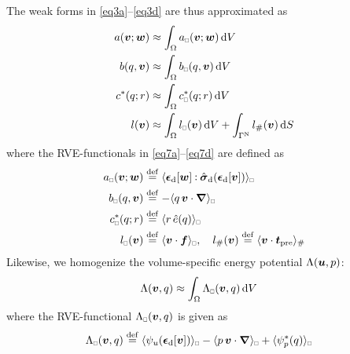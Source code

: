 \documentclass{bmcart}
\newcommand{\eqtrefrange}[2]{\eqref{#1}--\eqref{#2}}
\DeclarePairedDelimiter{\homgen}{\langle}{\rangle_\rve}
\newcommand{\prescribed}{\mathrm{pre}}
\renewcommand{\dev}{\mathrm{d}}
\newcommand{\rve}{
  {\mathchoice
   {\mbox{\scalebox{0.67}{$\Box$}}}
   {\mbox{\scalebox{0.67}{$\Box$}}}
   {\mbox{\scalebox{0.5}{$\Box$}}}
   {\mbox{\scalebox{0.375}{$\Box$}}}
  }
}
\begin{document}
The weak forms in \eqtrefrange{eq3a}{eq3d} are thus approximated as
\begin{align}
    a(\ta{v};\ta{w}) &\approx \int_\Omega a_\rve(\ta{v};\ta{w}) \dif V
\label{eq7a} \\
    b(q,\ta{v}) &\approx \int_\Omega b_\rve(q,\ta{v}) \dif V
\label{eq7b} \\
    c^*(q;r) &\approx \int_\Omega c^*_\rve(q;r) \dif V
\label{eq7c} \\
    l(\ta{v}) &\approx \int_\Omega l_\rve(\ta{v}) \dif V + \int_{\Gamma^\Neumann} l_\#(\ta{v}) \dif S
\label{eq7d}
\end{align}
where the RVE-functionals in \eqtrefrange{eq7a}{eq7d} are defined as
\begin{align}
    a_\rve(\ta{v};\ta{w}) &\defeq
    \homgen{ \ts{\epsilon}_\dev[\ta{w}]\dprod \hat{\ts{\sigma}}_\dev(\ts{\epsilon}_\dev[\ta{v}]) }
\label{eq8a} \\
    b_\rve(q,\ta{v}) &\defeq
    -  \homgen{ q\,\ta{v}\cdot\diff }
\label{eq8b} \\
    c^*_\rve(q;r) &\defeq
    \homgen{ r\,\hat{e}(q) }
\label{eq8c} \\
    l_\rve(\ta{v}) &\defeq
    \homgen{ \ta{v}\cdot\ta{f} }, \quad
    l_\#(\ta{v}) \defeq
    \langle \ta{v}\cdot \ta t_\prescribed \rangle_\#
\label{eq8d}
\end{align}
Likewise, we homogenize the volume-specific energy potential $\Lambda(\boldsymbol{u},p)$:
\begin{align}
    \Lambda(\ta{v},q) &\approx \int_\Omega \Lambda_\rve(\ta{v},q) \dif V
\label{eq222}
\end{align}
where the RVE-functional $\Lambda_\rve(\ta{v},q)$ is given as
\begin{align}
    \Lambda_\rve(\ta{v},q) &\defeq
    \homgen{ \psi_u(\ts{\epsilon}_\dev[\ta{v}])} -
    \homgen{  p\,\ta{v}\cdot\diff } + \homgen{ \psi_p^*(q) }
\label{eqRveBulkPotential}
\end{align}
\end{document}
